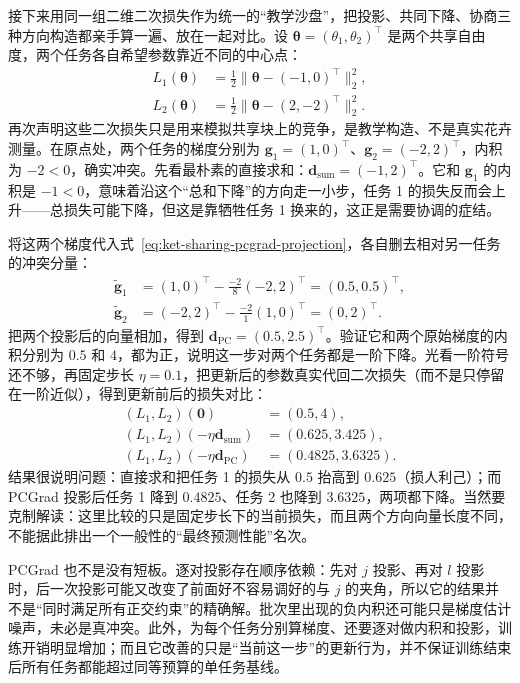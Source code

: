 接下来用同一组二维二次损失作为统一的“教学沙盘”，把投影、共同下降、协商三种方向构造都亲手算一遍、放在一起对比。设 $\bm\theta=(\theta_1,\theta_2)^\top$ 是两个共享自由度，两个任务各自希望参数靠近不同的中心点：
\begin{align}
  L_1(\bm\theta)
    &=\tfrac12\|\bm\theta-(-1,0)^{\top}\|_2^2,
  \nonumber\\
  L_2(\bm\theta)
    &=\tfrac12\|\bm\theta-(2,-2)^{\top}\|_2^2.
  \label{eq:ket-sharing-toy-losses}
\end{align}
再次声明这些二次损失只是用来模拟共享块上的竞争，是教学构造、不是真实花卉测量。在原点处，两个任务的梯度分别为 $\bm g_1=(1,0)^\top$、$\bm g_2=(-2,2)^\top$，内积为 $-2<0$，确实冲突。先看最朴素的直接求和：$\bm d_{\mathrm{sum}}=(-1,2)^\top$。它和 $\bm g_1$ 的内积是 $-1<0$，意味着沿这个“总和下降”的方向走一小步，任务 1 的损失反而会上升——总损失可能下降，但这是靠牺牲任务 1 换来的，这正是需要协调的症结。

将这两个梯度代入式~\eqref{eq:ket-sharing-pcgrad-projection}，各自删去相对另一任务的冲突分量：
\begin{align}
  \widetilde{\bm g}_1
    &=(1,0)^{\top}-\frac{-2}{8}(-2,2)^{\top}
      =(0.5,0.5)^{\top},
  \nonumber\\
  \widetilde{\bm g}_2
    &=(-2,2)^{\top}-\frac{-2}{1}(1,0)^{\top}
      =(0,2)^{\top}.
\end{align}
把两个投影后的向量相加，得到 $\bm d_{\mathrm{PC}}=(0.5,2.5)^\top$。验证它和两个原始梯度的内积分别为 $0.5$ 和 $4$，都为正，说明这一步对两个任务都是一阶下降。光看一阶符号还不够，再固定步长 $\eta=0.1$，把更新后的参数真实代回二次损失（而不是只停留在一阶近似），得到更新前后的损失对比：
\begin{align}
  (L_1,L_2)(\bm0)&=(0.5,4),
  \nonumber\\
  (L_1,L_2)(-\eta\bm d_{\mathrm{sum}})
    &=(0.625,3.425),
  \nonumber\\
  (L_1,L_2)(-\eta\bm d_{\mathrm{PC}})
    &=(0.4825,3.6325).
  \label{eq:ket-sharing-pcgrad-numbers}
\end{align}
结果很说明问题：直接求和把任务 1 的损失从 $0.5$ 抬高到 $0.625$（损人利己）；而 PCGrad 投影后任务 1 降到 $0.4825$、任务 2 也降到 $3.6325$，两项都下降。当然要克制解读：这里比较的只是固定步长下的当前损失，而且两个方向向量长度不同，不能据此排出一个一般性的“最终预测性能”名次。

PCGrad 也不是没有短板。逐对投影存在顺序依赖：先对 $j$ 投影、再对 $l$ 投影时，后一次投影可能又改变了前面好不容易调好的与 $j$ 的夹角，所以它的结果并不是“同时满足所有正交约束”的精确解。批次里出现的负内积还可能只是梯度估计噪声，未必是真冲突。此外，为每个任务分别算梯度、还要逐对做内积和投影，训练开销明显增加；而且它改善的只是“当前这一步”的更新行为，并不保证训练结束后所有任务都能超过同等预算的单任务基线。

